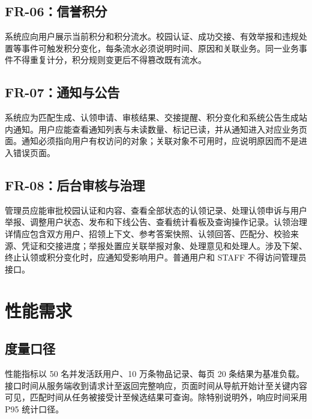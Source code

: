 \subsection{FR-06：信誉积分}

系统应向用户展示当前积分和积分流水。校园认证、成功交接、有效举报和违规处置等事件可触发积分变化，每条流水必须说明时间、原因和关联业务。同一业务事件不得重复计分，积分规则变更后不得篡改既有流水。

\subsection{FR-07：通知与公告}

系统应为匹配生成、认领申请、审核结果、交接提醒、积分变化和系统公告生成站内通知。用户应能查看通知列表与未读数量、标记已读，并从通知进入对应业务页面。通知必须指向用户有权访问的对象；关联对象不可用时，应说明原因而不是进入错误页面。

\subsection{FR-08：后台审核与治理}

管理员应能审批校园认证和内容、查看全部状态的认领记录、处理认领申诉与用户举报、调整用户状态、发布和下线公告、查看统计看板及查询操作记录。认领治理详情应包含双方用户、招领上下文、参考答案快照、认领回答、匹配分、校验来源、凭证和交接进度；举报处置应关联举报对象、处理意见和处理人。涉及下架、终止认领或积分变化时，应通知受影响用户。普通用户和 STAFF 不得访问管理员接口。

\section{性能需求}

\subsection{度量口径}

性能指标以 50 名并发活跃用户、10 万条物品记录、每页 20 条结果为基准负载。接口时间从服务端收到请求计至返回完整响应，页面时间从导航开始计至关键内容可见，匹配时间从任务被接受计至候选结果可查询。除特别说明外，响应时间采用 P95 统计口径。

